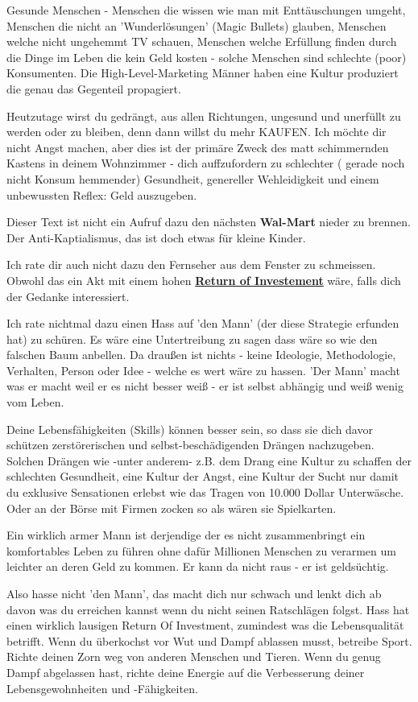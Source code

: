 Gesunde Menschen - Menschen die wissen wie man mit Enttäuschungen umgeht, Menschen die nicht an 'Wunderlösungen' (Magic Bullets) glauben, Menschen welche nicht ungehemmt TV schauen, Menschen welche Erfüllung finden durch die  Dinge im Leben die kein Geld kosten - solche Menschen sind schlechte (poor) Konsumenten. Die High-Level-Marketing Männer haben eine Kultur produziert die genau das Gegenteil propagiert.

Heutzutage wirst du gedrängt, aus allen Richtungen, ungesund und unerfüllt zu werden oder zu bleiben, denn dann willst du mehr KAUFEN. Ich möchte dir nicht Angst machen, aber dies ist der primäre Zweck des matt schimmernden Kastens in deinem Wohnzimmer - dich auffzufordern zu schlechter ( gerade noch nicht Konsum hemmender) Gesundheit, genereller Wehleidigkeit und einem unbewussten Reflex: Geld auszugeben. 

Dieser Text ist nicht ein Aufruf dazu den nächsten \textbf{Wal-Mart} nieder zu brennen. Der Anti-Kaptialismus, das  ist doch etwas für kleine Kinder.

Ich rate dir auch nicht dazu den Fernseher aus dem Fenster zu schmeissen. Obwohl das ein Akt mit einem hohen  \href{https://de.wikipedia.org/wiki/Return_on_Investment}{\textbf{Return of Investement}} wäre, falls dich der Gedanke interessiert. 

Ich rate nichtmal dazu einen Hass auf 'den Mann' (der diese Strategie erfunden hat) zu schüren. Es wäre eine Untertreibung zu sagen dass wäre so wie den falschen Baum anbellen. Da draußen ist nichts - keine Ideologie, Methodologie, Verhalten, Person oder Idee - welche es wert wäre zu hassen. 'Der Mann' macht was er macht weil er es nicht besser weiß - er ist selbst abhängig und weiß wenig vom Leben.

Deine Lebensfähigkeiten (Skills) können besser sein, so dass sie dich davor schützen zerstörerischen und selbst-beschädigenden Drängen nachzugeben. Solchen Drängen wie -unter anderem-  z.B. dem Drang eine Kultur zu schaffen der schlechten Gesundheit, eine Kultur der Angst, eine Kultur der Sucht nur damit du exklusive Sensationen erlebst wie das Tragen von 10.000 Dollar Unterwäsche. Oder an der Börse mit Firmen zocken so als wären sie Spielkarten. 

Ein wirklich armer Mann ist derjendige der es nicht zusammenbringt ein komfortables Leben zu führen ohne dafür Millionen Menschen zu verarmen um leichter an deren Geld zu kommen. Er kann da nicht raus - er ist geldsüchtig.

Also hasse nicht 'den Mann', das macht dich nur schwach und lenkt dich ab davon was du erreichen kannst wenn du nicht seinen Ratschlägen folgst. Hass hat einen wirklich lausigen Return Of Investment, zumindest was die Lebensqualität betrifft. Wenn du überkochst vor Wut und Dampf ablassen musst, betreibe Sport. Richte deinen Zorn weg von anderen Menschen und Tieren. Wenn du genug Dampf abgelassen hast, richte deine Energie auf die Verbesserung deiner Lebensgewohnheiten und -Fähigkeiten.

